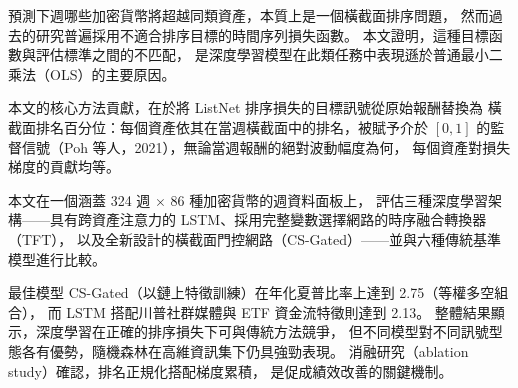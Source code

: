
預測下週哪些加密貨幣將超越同類資產，本質上是一個橫截面排序問題，
然而過去的研究普遍採用不適合排序目標的時間序列損失函數。
本文證明，這種目標函數與評估標準之間的不匹配，
是深度學習模型在此類任務中表現遜於普通最小二乘法（OLS）的主要原因。

本文的核心方法貢獻，在於將 ListNet 排序損失的目標訊號從原始報酬替換為
橫截面排名百分位：每個資產依其在當週橫截面中的排名，被賦予介於 $[0, 1]$
的監督信號（Poh 等人，2021），無論當週報酬的絕對波動幅度為何，
每個資產對損失梯度的貢獻均等。

本文在一個涵蓋 324 週 $\times$ 86 種加密貨幣的週資料面板上，
評估三種深度學習架構——具有跨資產注意力的 LSTM、採用完整變數選擇網路的時序融合轉換器（TFT），
以及全新設計的橫截面門控網路（CS-Gated）——並與六種傳統基準模型進行比較。

最佳模型 CS-Gated（以鏈上特徵訓練）在年化夏普比率上達到 2.75（等權多空組合），
而 LSTM 搭配川普社群媒體與 ETF 資金流特徵則達到 2.13。
整體結果顯示，深度學習在正確的排序損失下可與傳統方法競爭，
但不同模型對不同訊號型態各有優勢，隨機森林在高維資訊集下仍具強勁表現。
消融研究（ablation study）確認，排名正規化搭配梯度累積，
是促成績效改善的關鍵機制。
